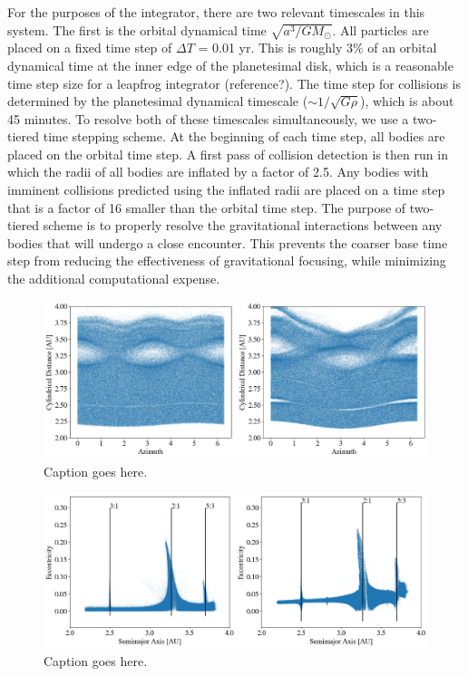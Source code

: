\documentclass[twocolumn]{aastex63}
\begin{document}
For the purposes of the integrator, there are two relevant timescales in this system. The first is the orbital dynamical time $\sqrt{a^3/G M_{\odot}}$. All particles are placed on a fixed time step of $\Delta T$ = 0.01 yr. This is roughly 3\% of an orbital dynamical time at the inner edge of the planetesimal disk, which is a reasonable time step size for a leapfrog integrator (reference?). The time step for collisions is determined by the planetesimal dynamical timescale ($\sim 1/\sqrt{G \rho}$), which is about 45 minutes. To resolve both of these timescales simultaneously, we use a two-tiered time stepping scheme. At the beginning of each time step, all bodies are placed on the orbital time step. A first pass of collision detection is then run in which the radii of all bodies are inflated by a factor of 2.5. Any bodies with imminent collisions predicted using the inflated radii are placed on a time step that is a factor of 16 smaller than the orbital time step. The purpose of two-tiered scheme is to properly resolve the gravitational interactions between any bodies that will undergo a close encounter. This prevents the coarser base time step from reducing the effectiveness of gravitational focusing, while minimizing the additional computational expense.

\begin{figure}
    \includegraphics[width=\textwidth]{figures/rtheta.png}
    \caption{Caption goes here.\label{fig:rtheta}}
\end{figure}

\begin{figure}
    \includegraphics[width=\textwidth]{figures/ae.png}
    \caption{Caption goes here.\label{fig:ae}}
\end{figure}
\end{document}
